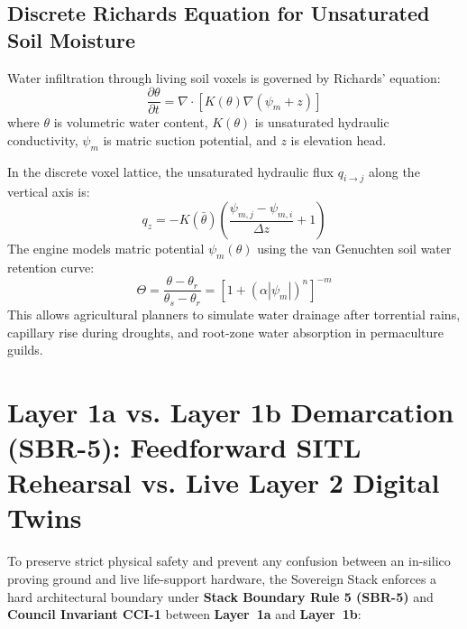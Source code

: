\subsection{Discrete Richards Equation for Unsaturated Soil Moisture}

Water infiltration through living soil voxels is governed by Richards' equation:
\begin{equation}
\frac{\partial \theta}{\partial t} = \nabla \cdot \left[ K(\theta) \nabla (\psi_m + z) \right]
\label{eq:richards_eq}
\end{equation}
where $\theta$ is volumetric water content, $K(\theta)$ is unsaturated hydraulic conductivity, $\psi_m$ is matric suction potential, and $z$ is elevation head.

In the discrete voxel lattice, the unsaturated hydraulic flux $q_{i \to j}$ along the vertical axis is:
\begin{equation}
q_{z} = -K(\bar{\theta}) \left( \frac{\psi_{m, j} - \psi_{m, i}}{\Delta z} + 1 \right)
\label{eq:discrete_richards}
\end{equation}
The engine models matric potential $\psi_m(\theta)$ using the van Genuchten soil water retention curve:
\begin{equation}
\Theta = \frac{\theta - \theta_r}{\theta_s - \theta_r} = \left[ 1 + (\alpha |\psi_m|)^n \right]^{-m}
\label{eq:van_genuchten}
\end{equation}
This allows agricultural planners to simulate water drainage after torrential rains, capillary rise during droughts, and root-zone water absorption in permaculture guilds.

\section{Layer 1a vs. Layer 1b Demarcation (SBR-5): Feedforward SITL Rehearsal vs. Live Layer 2 Digital Twins}

To preserve strict physical safety and prevent any confusion between an in-silico proving ground and live life-support hardware, the Sovereign Stack enforces a hard architectural boundary under \textbf{Stack Boundary Rule 5 (SBR-5)} and \textbf{Council Invariant CCI-1} between \textbf{Layer~1a} and \textbf{Layer~1b}:

